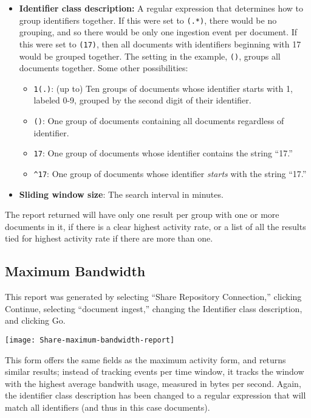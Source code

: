 \begin{changemargin}{1.5in}{0in}
\begin{itemize}
\item \textbf{Identifier class description:} A regular expression
that determines how to group identifiers together. If this were set to
\texttt{(.*)}, there would be no grouping, and so there would be only one
ingestion event per document. If this were set to \texttt{(17)},
then all documents with identifiers beginning with 17 would be grouped
together. The setting in the example, \texttt{()}, groups all
documents together. Some other possibilities:

\begin{itemize}

\item \texttt{1(.)}: (up to) Ten groups of documents whose identifier starts
with 1, labeled 0-9, grouped by the second digit of their identifier.

\item \texttt{()}: One group of documents containing all documents 
regardless of identifier.

\item \texttt{17}: One group of documents whose identifier contains
the string ``17.''

\item \texttt{\^{}17}: One group of documents whose identifier \emph{starts}
with the string ``17.''

\end{itemize}

\item \textbf{Sliding window size}: The search interval in minutes.

\end{itemize}

The report returned will have only one result per group with one or more
documents in it, if there is a clear highest activity rate, or a list of
all the results tied for highest activity rate if there are more than one.

\subsection{Maximum Bandwidth}

This report was generated by selecting ``Share Repository Connection,''
clicking Continue, selecting ``document ingest,'' changing the Identifier
class description, and clicking Go.

\texttt{[image: Share-maximum-bandwidth-report]}

This form offers the same fields as the maximum activity form, and
returns similar results; instead of tracking events per time window,
it tracks the window with the highest average bandwith usage, measured
in bytes per second. Again, the identifier class description has been
changed to a regular expression that will match all identifiers (and
thus in this case documents).


\end{changemargin}
